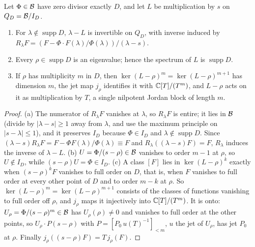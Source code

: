 \begin{proposition}[multiplication by $s$ on $\B/I_D$]\label{prop:spectral-L}
Let $\Phi\in\mathcal{B}$ have zero divisor exactly $D$, and let $L$ be multiplication by $s$ on $Q_D=\mathcal{B}/I_D$.
\begin{enumerate}[label=(\alph*)]
\item For $\lambda\notin\operatorname{supp}D$, $\lambda-L$ is invertible on $Q_D$, with inverse induced by $R_\lambda F=(F-\Phi\cdot F(\lambda)/\Phi(\lambda))/(\lambda-s)$.
\item Every $\rho\in\operatorname{supp}D$ is an eigenvalue; hence the spectrum of $L$ is $\operatorname{supp}D$.
\item If $\rho$ has multiplicity $m$ in $D$, then $\ker(L-\rho)^m=\ker(L-\rho)^{m+1}$ has dimension $m$, the jet map $j_\rho$ identifies it with $\mathbb{C}[T]/(T^m)$, and $L-\rho$ acts on it as multiplication by $T$, a single nilpotent Jordan block of length $m$.
\end{enumerate}
\end{proposition}

\begin{proof}
(a) The numerator of $R_\lambda F$ vanishes at $\lambda$, so $R_\lambda F$ is entire; it lies in $\mathcal{B}$ (divide by $|\lambda-s|\ge1$ away from $\lambda$, and use the maximum principle on $|s-\lambda|\le1$), and it preserves $I_D$ because $\Phi\in I_D$ and $\lambda\notin\operatorname{supp}D$.
Since $(\lambda-s)R_\lambda F=F-\Phi F(\lambda)/\Phi(\lambda)\equiv F$ and $R_\lambda((\lambda-s)F)=F$, $R_\lambda$ induces the inverse of $\lambda-L$.
(b) $U=\Phi/(s-\rho)\in\mathcal{B}$ vanishes to order $m-1$ at $\rho$, so $U\notin I_D$, while $(s-\rho)U=\Phi\in I_D$.
(c) A class $[F]$ lies in $\ker(L-\rho)^k$ exactly when $(s-\rho)^kF$ vanishes to full order on $D$, that is, when $F$ vanishes to full order at every other point of $D$ and to order $m-k$ at $\rho$. So $\ker(L-\rho)^m=\ker(L-\rho)^{m+1}$ consists of the classes of functions vanishing to full order off $\rho$, and $j_\rho$ maps it injectively into $\mathbb{C}[T]/(T^m)$.
It is onto: $U_\rho=\Phi/(s-\rho)^m\in\mathcal{B}$ has $U_\rho(\rho)\ne0$ and vanishes to full order at the other points, so $U_\rho\cdot P(s-\rho)$ with $P=[P_0\,u(T)^{-1}]_{<m}$, $u$ the jet of $U_\rho$, has jet $P_0$ at $\rho$.
Finally $j_\rho((s-\rho)F)=T\,j_\rho(F)$.
\end{proof}


